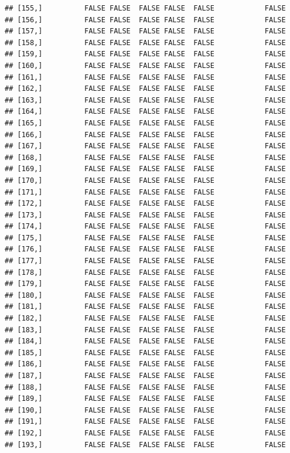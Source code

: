 \documentclass[
  english,
  man,floatsintext]{apa6}
\begin{document}
\begin{verbatim}
## [155,]          FALSE FALSE  FALSE FALSE  FALSE            FALSE
## [156,]          FALSE FALSE  FALSE FALSE  FALSE            FALSE
## [157,]          FALSE FALSE  FALSE FALSE  FALSE            FALSE
## [158,]          FALSE FALSE  FALSE FALSE  FALSE            FALSE
## [159,]          FALSE FALSE  FALSE FALSE  FALSE            FALSE
## [160,]          FALSE FALSE  FALSE FALSE  FALSE            FALSE
## [161,]          FALSE FALSE  FALSE FALSE  FALSE            FALSE
## [162,]          FALSE FALSE  FALSE FALSE  FALSE            FALSE
## [163,]          FALSE FALSE  FALSE FALSE  FALSE            FALSE
## [164,]          FALSE FALSE  FALSE FALSE  FALSE            FALSE
## [165,]          FALSE FALSE  FALSE FALSE  FALSE            FALSE
## [166,]          FALSE FALSE  FALSE FALSE  FALSE            FALSE
## [167,]          FALSE FALSE  FALSE FALSE  FALSE            FALSE
## [168,]          FALSE FALSE  FALSE FALSE  FALSE            FALSE
## [169,]          FALSE FALSE  FALSE FALSE  FALSE            FALSE
## [170,]          FALSE FALSE  FALSE FALSE  FALSE            FALSE
## [171,]          FALSE FALSE  FALSE FALSE  FALSE            FALSE
## [172,]          FALSE FALSE  FALSE FALSE  FALSE            FALSE
## [173,]          FALSE FALSE  FALSE FALSE  FALSE            FALSE
## [174,]          FALSE FALSE  FALSE FALSE  FALSE            FALSE
## [175,]          FALSE FALSE  FALSE FALSE  FALSE            FALSE
## [176,]          FALSE FALSE  FALSE FALSE  FALSE            FALSE
## [177,]          FALSE FALSE  FALSE FALSE  FALSE            FALSE
## [178,]          FALSE FALSE  FALSE FALSE  FALSE            FALSE
## [179,]          FALSE FALSE  FALSE FALSE  FALSE            FALSE
## [180,]          FALSE FALSE  FALSE FALSE  FALSE            FALSE
## [181,]          FALSE FALSE  FALSE FALSE  FALSE            FALSE
## [182,]          FALSE FALSE  FALSE FALSE  FALSE            FALSE
## [183,]          FALSE FALSE  FALSE FALSE  FALSE            FALSE
## [184,]          FALSE FALSE  FALSE FALSE  FALSE            FALSE
## [185,]          FALSE FALSE  FALSE FALSE  FALSE            FALSE
## [186,]          FALSE FALSE  FALSE FALSE  FALSE            FALSE
## [187,]          FALSE FALSE  FALSE FALSE  FALSE            FALSE
## [188,]          FALSE FALSE  FALSE FALSE  FALSE            FALSE
## [189,]          FALSE FALSE  FALSE FALSE  FALSE            FALSE
## [190,]          FALSE FALSE  FALSE FALSE  FALSE            FALSE
## [191,]          FALSE FALSE  FALSE FALSE  FALSE            FALSE
## [192,]          FALSE FALSE  FALSE FALSE  FALSE            FALSE
## [193,]          FALSE FALSE  FALSE FALSE  FALSE            FALSE

\end{verbatim}
\end{document}
